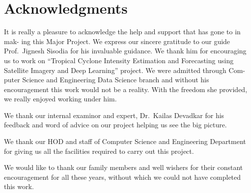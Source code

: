 
\chapter*{Acknowledgments}
\thispagestyle{empty}
It is really a pleasure to acknowledge the help and support that has gone to in mak-
ing this Major Project. We express our sincere gratitude to our guide Prof.\ Jignesh Sisodia for his invaluable guidance. We thank him for encouraging us to work
on  ``Tropical Cyclone Intensity Estimation and Forecasting using Satellite Imagery and Deep Learning'' project. We were admitted through Com-
puter Science and Engineering Data Science branch and without his encouragement
this work would not be a reality. With the freedom she provided, we really enjoyed working under him.\par
We thank our internal examinor and expert, Dr.\ Kailas Devadkar for his feedback and word of advice on
our project helping us see the big picture.\par
We thank our HOD and staff of Computer Science and Engineering Department
for giving us all the facilities required to carry out this project.\par
We would like to thank our family members and well wishers for their constant
encouragement for all these years, without which we could not have completed this
work.
   

